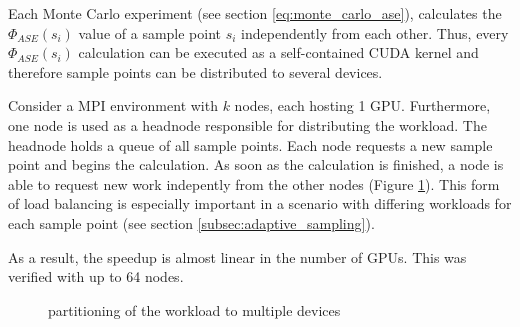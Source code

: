 Each Monte Carlo experiment (see section \ref{eq:monte_carlo_ase}), calculates
the $\Phi_{ASE}(s_i)$ value of a sample point $s_i$ independently from each
other. Thus, every $\Phi_{ASE}(s_i)$ calculation can be executed as a
self-contained CUDA kernel and therefore sample points can be distributed to
several devices.

Consider a MPI environment with $k$ nodes, each hosting 1 GPU. Furthermore, one
node is used as a headnode responsible for distributing the workload. The
headnode holds a queue of all sample points. Each node requests a new sample
point and begins the calculation. As soon as the calculation is finished, a node
is able to request new work indepently from the other nodes (Figure
\ref{graphic:multigpu}). This form of load balancing is especially important in a
scenario with differing workloads for each sample point (see section
\ref{subsec:adaptive_sampling}).

As a result, the speedup is almost linear in the number of GPUs. This was
verified with up to 64 nodes.
%
    
\begin{figure}[H]
  \centerline
  {}
  \caption{partitioning of the workload to multiple devices}
  \label{graphic:multigpu}
\end{figure}

